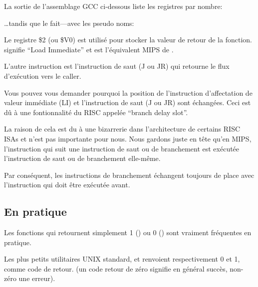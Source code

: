 \label{MIPS_leaf_function_ex1}

La sortie de l'assemblage GCC ci-dessous liste les registres par nombre:



\dots tandis que \IDA le fait---avec les pseudo noms:



Le registre \$2 (ou \$V0) est utilisé pour stocker la valeur de retour de la fonction.
 signifie ``Load Immediate'' et est l'équivalent MIPS de \MOV.


L'autre instruction est l'instruction de saut (J ou JR) qui retourne le flux d'exécution vers le \gls{caller}.


Vous pouvez vous demander pourquoi la position de l'instruction d'affectation de valeur immédiate (LI) et l'instruction de saut (J ou JR) sont échangées. Ceci est dû à une fontionnalité du \ac{RISC} appelée ``branch delay slot''.

La raison de cela est du à une bizarrerie dans l'architecture de certains RISC \ac{ISA}s et n'est pas importante pour nous. Nous gardons juste en tête qu'en MIPS, l'instruction qui suit une instruction de saut ou de branchement est exécutée  l'instruction de saut ou de branchement elle-même.

Par conséquent, les instructions de branchement échangent toujours de place avec l'instruction qui doit être exécutée avant.


\subsection{En pratique}

Les fonctions qui retournent simplement 1 () ou 0 () sont vraiment fréquentes en pratique.

Les plus petits utilitaires UNIX standard,  et  renvoient
respectivement 0 et 1, comme code de retour.
(un code retour de zéro signifie en général succès, non-zéro une erreur).

